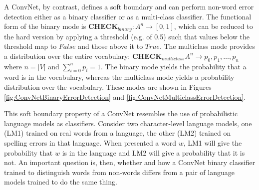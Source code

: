 A ConvNet, by contrast, defines a soft boundary and can perform non-word error detection either as a binary classifier or as a multi-class classifier.  The functional form of the binary mode is $\textbf{CHECK}_{binary}: A^n \to [0,1]$, which can be reduced to the hard version by applying a threshold (e.g. of 0.5) such that values below the threshold map to $False$ and those above it to $True$.  The multiclass mode provides a distribution over the entire vocabulary: $\textbf{CHECK}_{multiclass} A^n \to p_0, p_1, \ldots, p_n$ where $n = |V|$ and $\sum_{i=0}^n p_i = 1$.  The binary mode yields the probability that a word is in the vocabulary, whereas the multiclass mode yields a probability distribution over the vocabulary.  These modes are shown in Figures \ref{fig:ConvNetBinaryErrorDetection} and \ref{fig:ConvNetMulticlassErrorDetection}.

This soft boundary property of a ConvNet resembles the use of probabilistic language models as classifiers.  Consider two character-level language models, one (LM1) trained on real words from a language, the other (LM2) trained on spelling errors in that language.  When presented a word $w$, LM1 will give the probability that $w$ is in the language and LM2 will give a probability that it is not.  An important question is, then, whether and how a ConvNet binary classifier trained to distinguish words from non-words differs from a pair of language models trained to do the same thing.   






